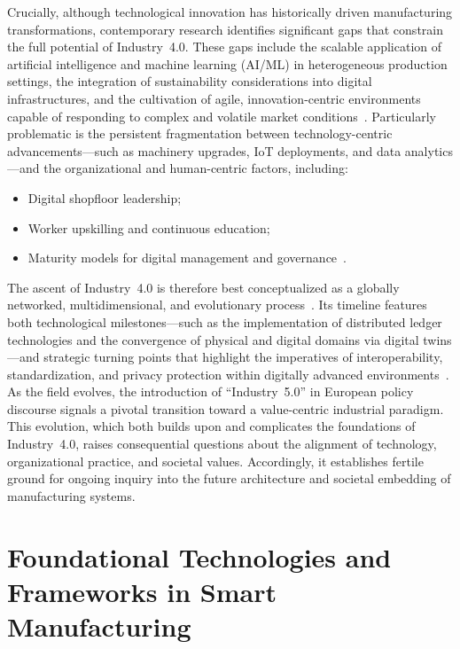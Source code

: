 Crucially, although technological innovation has historically driven manufacturing transformations, contemporary research identifies significant gaps that constrain the full potential of Industry~4.0. These gaps include the scalable application of artificial intelligence and machine learning (AI/ML) in heterogeneous production settings, the integration of sustainability considerations into digital infrastructures, and the cultivation of agile, innovation-centric environments capable of responding to complex and volatile market conditions~\cite{ref41,ref63,ref86}. Particularly problematic is the persistent fragmentation between technology-centric advancements---such as machinery upgrades, IoT deployments, and data analytics---and the organizational and human-centric factors, including:

\begin{itemize}
    \item Digital shopfloor leadership;
    \item Worker upskilling and continuous education;
    \item Maturity models for digital management and governance~\cite{ref92}.
\end{itemize}

The ascent of Industry~4.0 is therefore best conceptualized as a globally networked, multidimensional, and evolutionary process~\cite{ref24}. Its timeline features both technological milestones---such as the implementation of distributed ledger technologies and the convergence of physical and digital domains via digital twins---and strategic turning points that highlight the imperatives of interoperability, standardization, and privacy protection within digitally advanced environments~\cite{ref67,ref91}. As the field evolves, the introduction of ``Industry~5.0'' in European policy discourse signals a pivotal transition toward a value-centric industrial paradigm. This evolution, which both builds upon and complicates the foundations of Industry~4.0, raises consequential questions about the alignment of technology, organizational practice, and societal values. Accordingly, it establishes fertile ground for ongoing inquiry into the future architecture and societal embedding of manufacturing systems.

\section{Foundational Technologies and Frameworks in Smart Manufacturing}

